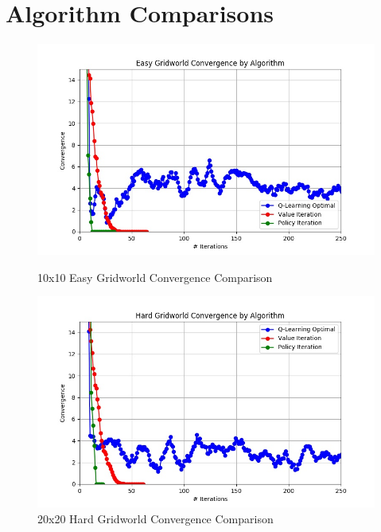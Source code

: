 \documentclass[h]{article}
\begin{document}
\section*{Algorithm Comparisons}

  \begin{figure}[H]
   \endminipage\hfill
      \includegraphics[width=1\textwidth,keepaspectratio]{easy_convergence.jpg} 
      \caption*{10x10 Easy Gridworld Convergence Comparison} 
   \endminipage\hfill
      \includegraphics[width=1\textwidth,keepaspectratio]{hard_convergence.jpg} 
      \caption*{20x20 Hard Gridworld Convergence Comparison} 
   \endminipage\hfill
   \endminipage\hfill
\end{figure}
\end{document}
